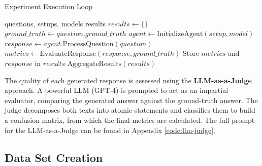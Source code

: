         \begin{algorithm}[h]
        \caption{Experiment Execution Loop}
        \begin{algorithmic}[1]
        \Require questions, setups, models
        \Ensure results
            \State $results \gets \{\}$
                \State $ground\_truth \gets question.ground\_truth$
                         
                            \State $agent \gets \text{InitializeAgent}(setup, model)$
                            \State $response \gets agent.\text{ProcessQuestion}(question)$
                            \State $metrics \gets \text{EvaluateResponse}(response, ground\_truth)$
                            \State Store $metrics$ and $response$ in $results$
                        \EndFor
                    \EndFor
                \EndFor
            \EndFor
            \State \Return $\text{AggregateResults}(results)$
        \EndFunction
        \end{algorithmic}
        \label{alg:execution_loop}
        \end{algorithm}

        The quality of each generated response is assessed using the \textbf{LLM-as-a-Judge} approach. A powerful LLM (GPT-4) is prompted to act as an impartial evaluator, comparing the generated answer against the ground-truth answer. The judge decomposes both texts into atomic statements and classifies them to build a confusion matrix, from which the final metrics are calculated. The full prompt for the LLM-as-a-Judge can be found in Appendix \ref{code:llm-judge}.

    \subsection{Data Set Creation}

